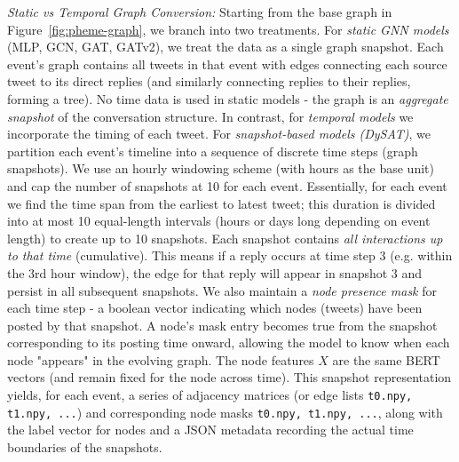 \documentclass{cshonours}
\begin{document}
\emph{Static vs Temporal Graph Conversion:} Starting from the base graph in Figure~\ref{fig:pheme-graph}, we branch into two treatments. For \emph{static GNN models} (MLP, GCN, GAT, GATv2), we treat the data as a single graph snapshot. Each event's graph contains all tweets in that event with edges connecting each source tweet to its direct replies (and similarly connecting replies to their replies, forming a tree). No time data is used in static models - the graph is an \emph{aggregate snapshot} of the conversation structure. In contrast, for \emph{temporal models} we incorporate the timing of each tweet. For \emph{snapshot-based models (DySAT)}, we partition each event's timeline into a sequence of discrete time steps (graph snapshots). We use an hourly windowing scheme (with hours as the base unit) and cap the number of snapshots at 10 for each event. Essentially, for each event we find the time span from the earliest to latest tweet; this duration is divided into at most 10 equal-length intervals (hours or days long depending on event length) to create up to 10 snapshots. Each snapshot contains \emph{all interactions up to that time} (cumulative). This means if a reply occurs at time step 3 (e.g. within the 3rd hour window), the edge for that reply will appear in snapshot 3 and persist in all subsequent snapshots. We also maintain a \emph{node presence mask} for each time step - a boolean vector indicating which nodes (tweets) have been posted by that snapshot. A node's mask entry becomes true from the snapshot corresponding to its posting time onward, allowing the model to know when each node "appears" in the evolving graph. The node features $X$ are the same BERT vectors (and remain fixed for the node across time). This snapshot representation yields, for each event, a series of adjacency matrices (or edge lists \texttt{t0.npy, t1.npy, ...}) and corresponding node masks \texttt{t0.npy, t1.npy, ...}, along with the label vector for nodes and a JSON metadata recording the actual time boundaries of the snapshots.
\end{document}
